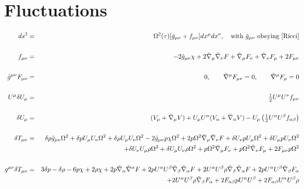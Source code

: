 \documentclass[10pt,letterpaper]{article}
\numberwithin{equation}{section}
\begin{document}
\section{Fluctuations}
\begin{eqnarray}
ds^2 &=& \Omega^2(\tau)[\tilde g_{\mu\nu}+ f_{\mu\nu}] dx^\mu dx^\nu,\quad \text{with $\tilde g_{\mu\nu}$ obeying \eqref{Ricci}}
\\ \nonumber\\
f_{\mu\nu} &=& -2\tilde g_{\mu\nu}\chi + 2\tilde\nabla_\mu \tilde\nabla_\nu F + \tilde\nabla_\mu F_\nu +\tilde\nabla_\nu F_\mu+ 2F_{\mu\nu}
\label{svt}
\\ \nonumber\\
\tilde g^{\mu\nu} F_{\mu\nu} &=&0,\qquad \tilde\nabla^\mu F_{\mu\nu} = 0,\qquad \tilde\nabla^\mu F_\mu = 0
\\ \nonumber\\
U^\mu \delta U_\mu &=& \tfrac12 U^\mu U^\nu f_{\mu\nu}
\\ \nonumber\\
\delta U_{\mu} &=& (V_\mu + \tilde\nabla_\mu V) + U_\mu U^\alpha(V_\alpha + \tilde\nabla_\alpha V)-U_\mu\left(\tfrac12 U^\alpha U^\beta f_{\alpha\beta}\right)
\\ \nonumber\\
\delta T_{\mu\nu}&=& \delta p \tilde{g}_{\mu \nu } \Omega^2 + \delta p U_{\mu } U_{\nu } \Omega^2 + \delta \rho U_{\mu } U_{\nu } \Omega^2 - 2 \tilde{g}_{\mu \nu } p \chi \Omega^2 + 2 p \Omega^2 \tilde{\nabla}_{\mu }\tilde{\nabla}_{\nu }F+\delta U_{\nu } p U_{\mu } \Omega^2 + \delta U_{\mu } p U_{\nu } \Omega^2 \nonumber \\ 
&& + \delta U_{\nu } U_{\mu } \rho \Omega^2 + \delta U_{\mu } U_{\nu } \rho \Omega^2 + p \Omega^2 \tilde{\nabla}_{\mu }F_{\nu } + p \Omega^2 \tilde{\nabla}_{\nu }F_{\mu }+2 F_{\mu \nu } p \Omega^2
\\  \nonumber\\ 
g^{\mu\nu}\delta T_{\mu\nu}&=& 3 \delta p -  \delta \rho - 6 p \chi + 2 \rho \chi + 2 p \tilde{\nabla}_{\alpha }\tilde{\nabla}^{\alpha }F + 2 p U^{\alpha } U^{\beta } \tilde{\nabla}_{\beta }\tilde{\nabla}_{\alpha }F + 2 U^{\alpha } U^{\beta } \rho \tilde{\nabla}_{\beta }\tilde{\nabla}_{\alpha }F+2 p U^{\alpha } U^{\beta } \tilde{\nabla}_{\beta }F_{\alpha } \nonumber \\ 
&& + 2 U^{\alpha } U^{\beta } \rho \tilde{\nabla}_{\beta }F_{\alpha }+2 F_{\alpha \beta } p U^{\alpha } U^{\beta } + 2 F_{\alpha \beta } U^{\alpha } U^{\beta } \rho 
\nonumber\\  \\ \nonumber\\

\end{eqnarray}
\end{document}
